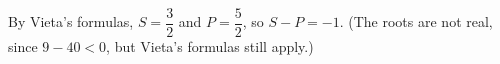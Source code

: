 By Vieta's formulas, $S=\dfrac32$ and $P=\dfrac52$, so $S-P=\boxed{-1}$. (The roots are not real, since $9-40<0$, but Vieta's formulas still apply.)
